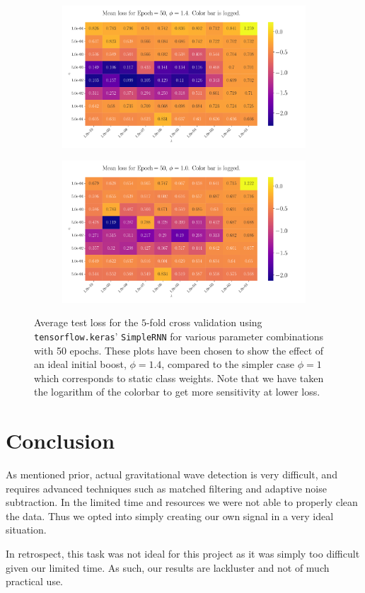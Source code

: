 \documentclass[%
reprint,
amsmath,amssymb,
aps,
]{revtex4-2}
\begin{document}
\begin{figure}[ht!]
	\begin{subfigure}{0.499\textwidth}
		\includegraphics[width=\textwidth]{Figures/2D_Plot_Loss_Epoch50_Boost1.4.pdf}
	\end{subfigure}
	\newline
	\begin{subfigure}{0.499\textwidth}
		\includegraphics[width=\textwidth]{Figures/2D_Plot_Loss_Epoch50_Boost1.0.pdf}
	\end{subfigure}
	\caption{Average test loss for the $5$-fold cross validation using \texttt{tensorflow.keras}' \texttt{SimpleRNN} for various parameter combinations with 50 epochs. These plots have been chosen to show the effect of an ideal initial boost, $\phi=1.4$, compared to the simpler case $\phi=1$ which corresponds to static class weights. Note that we have taken the logarithm of the colorbar to get more sensitivity at lower loss.}
	\label{fig:PhiShowcase}	
\end{figure}


\section{Conclusion}
As mentioned prior, actual gravitational wave detection is very difficult, and requires advanced techniques such as matched filtering and adaptive noise subtraction. In the limited time and resources we were not able to properly clean the data. Thus we opted into simply creating our own signal in a very ideal situation. 

In retrospect, this task was not ideal for this project as it was simply too difficult given our limited time. As such, our results are lackluster and not of much practical use.



	
\end{document}
